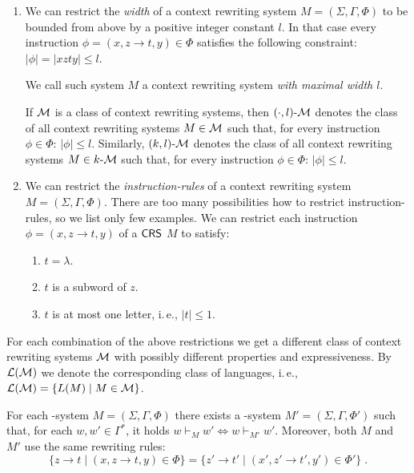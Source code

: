 \begin{definition}
\begin{enumerate}
\item\label{restriction:width}
We can restrict the \emph{width} of a context rewriting system $M=(\Sigma, \Gamma, \Phi)$ to be bounded from above by a positive integer constant $l$. In that case every instruction $\phi = (x, z \to t, y) \in \Phi$ satisfies the following constraint: $|\phi| = |xzty| \le l$.

We call such system $M$ a context rewriting system \emph{with maximal width $l$}.

If $\textup{\sf $\mathcal{M}$}$ is a class of context rewriting systems, then $\textup{\sf $(\cdot,l)$-\textup{\sf $\mathcal{M}$}}$ denotes the class of all context rewriting systems $M \in \textup{\sf $\mathcal{M}$}$ such that, for every instruction $\phi \in \Phi$: $|\phi| \le l$. Similarly, $\textup{\sf $(k,l)$-\textup{\sf $\mathcal{M}$}}$ denotes the class of all context rewriting systems $M \in \textup{\sf $k$-\textup{\sf $\mathcal{M}$}}$ such that, for every instruction $\phi \in \Phi$: $|\phi| \le l$.

\item\label{restriction:rules}
We can restrict the \emph{instruction-rules} of a context rewriting system $M=(\Sigma, \Gamma, \Phi)$. There are too many possibilities how to restrict instruction-rules, so we list only few examples. We can restrict each instruction $\phi = (x, z \to t, y)$ of a
$\textup{\sf CRS\/}$ $M$ to satisfy:
\begin{enumerate}
\item $t = \lambda$.
\item $t$ is a subword of $z$.
\item $t$ is at most one letter, i.\,e., $|t| \le 1$.
\end{enumerate}
\end{enumerate}
For each combination of the above restrictions we get a different class of context rewriting systems $\textup{\sf $\mathcal{M}$}$ with possibly different properties and expressiveness. By ${\cal L}(\textup{\sf $\mathcal{M}$})$ we denote the corresponding class of languages, i.\,e., ${\cal L}(\textup{\sf $\mathcal{M}$}) = \{L(M) \mid M \in \textup{\sf $\mathcal{M}$}\}$. 
\end{definition}

\begin{theorem}\label{theorem:context_extension}
For each \kCRS[k]-system $M=(\Sigma, \Gamma, \Phi)$ there exists a \kCRS[(k+1)]-system $M'=(\Sigma, \Gamma, \Phi')$ such that, for each $w, w' \in \Gamma^*$, it holds $w \vdash_M w' \Leftrightarrow w \vdash_{M'} w'$. Moreover, both $M$ and $M'$ use the same rewriting rules:
$$\{ z \to t \mid (x, z \to t, y) \in \Phi \} = \{ z' \to t' \mid (x', z' \to t', y') \in \Phi' \}\;.$$
\end{theorem}

